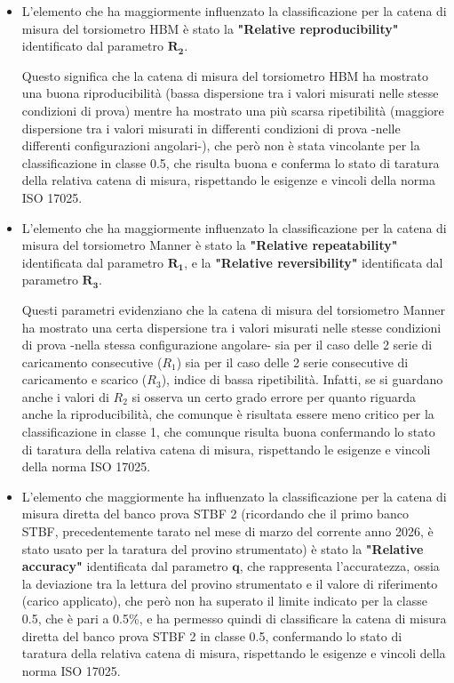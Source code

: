 \documentclass[a4paper, twoside]{article}
\begin{document}
\begin{itemize}
    
    \item  L'elemento che ha maggiormente influenzato la classificazione per la catena di misura del torsiometro HBM è stato la \textbf{"Relative reproducibility"} identificato dal parametro $\mathbf{R_2}$. 
    
    Questo significa che la catena di misura del torsiometro HBM ha mostrato una buona riproducibilità (bassa dispersione tra i valori misurati nelle stesse condizioni di prova) mentre ha mostrato una più scarsa ripetibilità (maggiore dispersione tra i valori misurati in differenti condizioni di prova -nelle differenti configurazioni angolari-), che però non è stata vincolante per la classificazione in classe 0.5, che risulta buona e conferma lo stato di taratura della relativa catena di misura, rispettando le esigenze e vincoli della norma ISO 17025.
    
    \item  L'elemento che ha maggiormente influenzato la classificazione per la catena di misura del torsiometro Manner è stato la \textbf{"Relative repeatability"} identificata dal parametro $\mathbf{R_1}$, e la \textbf{"Relative reversibility"} identificata dal parametro $\mathbf{R_3}$. 
    
    Questi parametri evidenziano che la catena di misura del torsiometro Manner ha mostrato una certa dispersione tra i valori misurati nelle stesse condizioni di prova -nella stessa configurazione angolare- sia per il caso delle 2 serie di caricamento consecutive ($R_1$) sia per il caso delle 2 serie consecutive di caricamento e scarico ($R_3$), indice di bassa ripetibilità. Infatti, se si guardano anche i valori di $R_2$ si osserva un certo grado errore per quanto riguarda anche la riproducibilità, che comunque è risultata essere meno critico per la classificazione in classe 1, che comunque risulta buona confermando lo stato di taratura della relativa catena di misura, rispettando le esigenze e vincoli della norma ISO 17025.

    \item L'elemento che maggiormente ha influenzato la classificazione per la catena di misura diretta del banco prova STBF 2 (ricordando che il primo banco STBF, precedentemente tarato nel mese di marzo del corrente anno 2026, è stato usato per la taratura del provino strumentato) è stato la \textbf{"Relative accuracy"} identificata dal parametro $\mathbf{q}$, che rappresenta l'accuratezza, ossia la deviazione tra la lettura del provino strumentato e il valore di riferimento (carico applicato), che però non ha superato il limite indicato per la classe 0.5, che è pari a 0.5\%, e ha permesso quindi di classificare la catena di misura diretta del banco prova STBF 2 in classe 0.5, confermando lo stato di taratura della relativa catena di misura, rispettando le esigenze e vincoli della norma ISO 17025.
    

\end{itemize}
\end{document}

